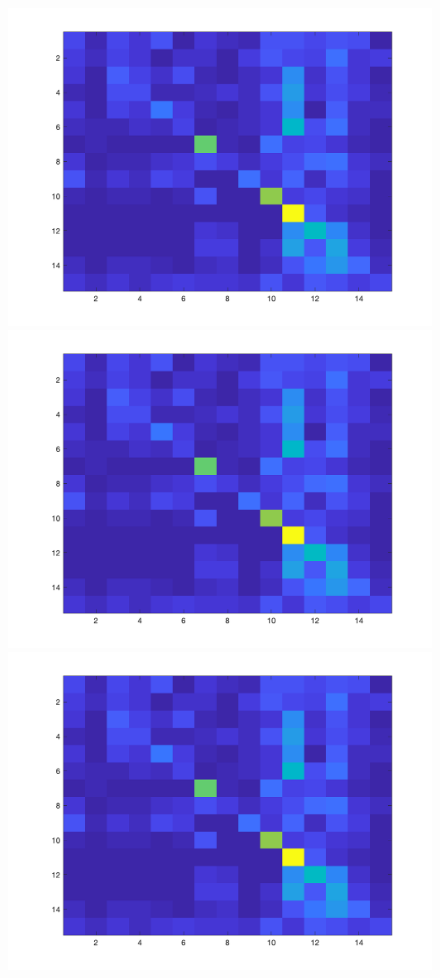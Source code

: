 \documentclass[letter, 11pt]{article}
\begin{document}
\begin{figure}[h]
        \centering
        \includegraphics[width=\textwidth]{HW3/RESULT/ClassifyKNN_Tiny_confusion.png}
    \endminipage\hfill
        \centering
        \includegraphics[width=\textwidth]{HW3/RESULT/ClassifyKNN_Tiny_confusion.png}
    \endminipage\hfill
        \centering
        \includegraphics[width=\textwidth]{HW3/RESULT/ClassifyKNN_Tiny_confusion.png}
    \endminipage\hfill
\end{figure}
\end{document}
